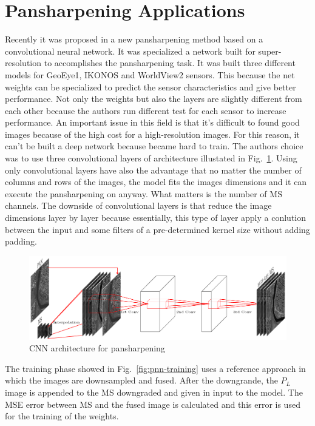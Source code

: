 \documentclass[12pt]{report}
\begin{document}
\newpage

\section{Pansharpening Applications}

Recently it was proposed in \cite{pnn} a new pansharpening method based on a convolutional neural network.
It was specialized a network built for super-resolution \cite{superesolution} to accomplishes the 
pansharpening task.
It was built three different models for GeoEye1, IKONOS and WorldView2 sensors. This because the net weights 
can be specialized to predict the sensor characteristics and give better performance. 
Not only the weights but also the layers are slightly different from each other because the authors run different 
test for each sensor to increase performance.
An important issue in this field is that it's difficult to found good images because of the high cost for a high-resolution images.
For this reason, it can't be built a deep network because became hard to train. The authors choice was to use three convolutional layers of architecture illustated in Fig.~\ref{fig:dl-pnn}. Using only convolutional layers have also the advantage that no matter the number of columns and rows
of the images, the model fits the images dimensions and it can execute the pansharpening on anyway. What matters is the number of MS channels.
The downside of convolutional layers is that reduce the image dimensions layer by layer because essentially, this type of layer
apply a conlution between the input and some filters of a pre-determined kernel size without adding padding.

\begin{figure}[t]
    \centering
    \includegraphics[scale=.8]{dl-pnn.png}
    \caption{CNN architecture for pansharpening\cite{pnn}}
    \label{fig:dl-pnn}
\end{figure}

\newpage

The training phase showed in Fig.~\ref{fig:pnn-training} uses a reference approach in which the images are downsampled and fused. 
After the downgrande, the $P_L$ image is appended to the MS downgraded and given in input to the model.
The MSE error between MS and the fused image is calculated and this error is used for the training of the weights.
\end{document}
